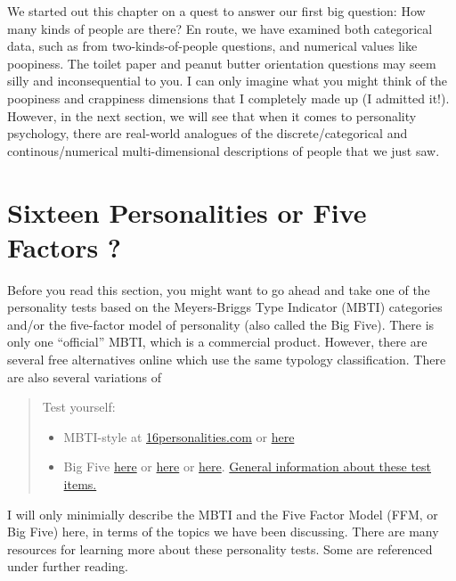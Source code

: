 \documentclass[]{book}
\begin{document}
We started out this chapter on a quest to answer our first big question: How many kinds of people are there? En route, we have examined both categorical data, such as from two-kinds-of-people questions, and numerical values like poopiness. The toilet paper and peanut butter orientation questions may seem silly and inconsequential to you. I can only imagine what you might think of the poopiness and crappiness dimensions that I completely made up (I admitted it!). However, in the next section, we will see that when it comes to personality psychology, there are real-world analogues of the discrete/categorical and continous/numerical multi-dimensional descriptions of people that we just saw.

\hypertarget{sixteen-personalities-or-five-factors}{%
\section{Sixteen Personalities or Five Factors ?}\label{sixteen-personalities-or-five-factors}}

Before you read this section, you might want to go ahead and take one of the personality tests based on
the Meyers-Briggs Type Indicator (MBTI) categories and/or the five-factor model of personality (also called the Big Five). There is only one ``official'' MBTI, which is a commercial product. However, there are several free alternatives online which use the same typology classification. There are also several variations of

\begin{quote}
Test yourself:

\begin{itemize}
\item
  MBTI-style at \url{16personalities.com} or \href{https://openpsychometrics.org/tests/OEJTS/}{here}
\item
  Big Five \href{http://www.personal.psu.edu/~j5j/IPIP/}{here} or \href{https://bigfive-test.com/}{here} or \href{https://openpsychometrics.org/tests/IPIP-BFFM/}{here}. \href{https://ipip.ori.org/}{General information about these test items.}
\end{itemize}
\end{quote}

I will only minimially describe the MBTI and the Five Factor Model (FFM, or Big Five) here, in terms of the topics we have been discussing. There are many resources for learning more about these personality tests. Some are referenced under further reading.
\end{document}
